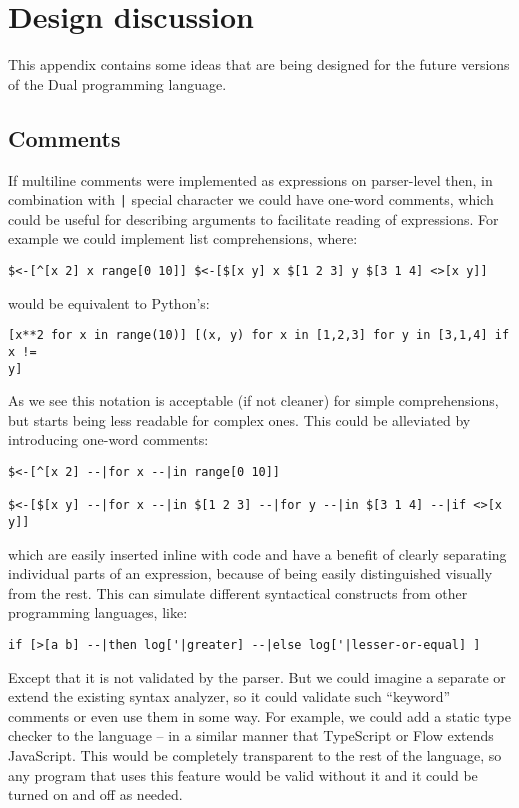 \chapter{Design discussion}\label{app:design}
This appendix contains some ideas that are being designed for the future versions of the Dual programming language.

\section{Comments}\label{sec:comments}
If multiline comments were implemented as expressions on parser-level then, in
combination with \texttt{|} special character we could have one-word comments,
which could be useful for describing arguments to facilitate reading of
expressions. For example we could implement list comprehensions, where:
\begin{lstlisting}
$<-[^[x 2] x range[0 10]] $<-[$[x y] x $[1 2 3] y $[3 1 4] <>[x y]]
\end{lstlisting}
would be equivalent to
Python's\cite[Section~5.1.3]{python_tutorial}:
\begin{lstlisting}
[x**2 for x in range(10)] [(x, y) for x in [1,2,3] for y in [3,1,4] if x !=
y]
\end{lstlisting}
As we see this notation is acceptable (if not cleaner) for simple
comprehensions, but starts being less readable for complex ones. This could be
alleviated by introducing one-word comments:
\begin{lstlisting}
$<-[^[x 2] --|for x --|in range[0 10]]

$<-[$[x y] --|for x --|in $[1 2 3] --|for y --|in $[3 1 4] --|if <>[x y]]
\end{lstlisting}
which are easily inserted inline with code and have a benefit of clearly
separating individual parts of an expression, because of being easily
distinguished visually from the rest. This can simulate different syntactical
constructs from other programming languages, like:
\begin{lstlisting}
if [>[a b] --|then log['|greater] --|else log['|lesser-or-equal] ]
\end{lstlisting}
Except that it is not validated by the parser. But we could imagine a separate
or extend the existing syntax analyzer, so it could validate such ``keyword''
comments or even use them in some way. For example, we could add a static type
checker to the language -- in a similar manner that TypeScript or
Flow\cite{flow_site} extends JavaScript. This would be
completely transparent to the rest of the language, so any program that uses
this feature would be valid without it and it could be turned on and off as
needed.

